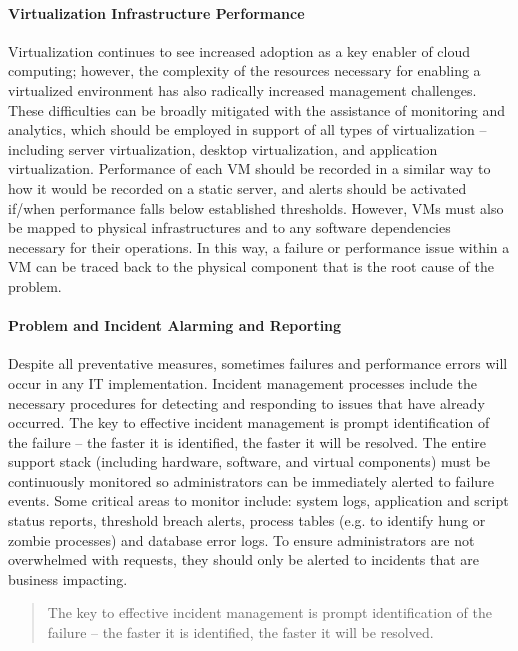 \documentclass[8pt]{extarticle}
\begin{document}
\begin{multicols}{3}
\paragraph{Virtualization Infrastructure Performance}
Virtualization continues to see increased adoption as a key enabler of cloud computing; however, the
complexity of the resources necessary for enabling a virtualized environment has also radically increased
management challenges. These difficulties can be broadly mitigated with the assistance of monitoring
and analytics, which should be employed in support of all types of virtualization – including server
virtualization, desktop virtualization, and application virtualization. Performance of each VM should
be recorded in a similar way to how it would be recorded on a static server, and alerts should be
activated if/when performance falls below established thresholds. However, VMs must also be mapped
to physical infrastructures and to any software dependencies necessary for their operations. In this way,
a failure or performance issue within a VM can be traced back to the physical component that is the
root cause of the problem.

\paragraph{Problem and Incident Alarming and Reporting}
Despite all preventative measures, sometimes failures and performance errors will occur in any IT
implementation. Incident management processes include the necessary procedures for detecting and
responding to issues that have already occurred. The key to effective incident management is prompt
identification of the failure – the faster it is identified, the faster it will
be resolved. The entire support stack (including hardware, software, and virtual components) must be continuously 
monitored so administrators can be immediately alerted to failure events. Some critical areas to monitor include: 
system logs, application and script status reports, threshold breach alerts, process tables 
(e.g. to identify hung or zombie processes) and database error logs.
To ensure administrators are not overwhelmed with requests, they should only be alerted to incidents that are business
impacting.

\begin{quotation}
    \noindent
The key to effective incident management is prompt identification of the failure – the faster it is identified, 
the faster it will be resolved.
\end{quotation}



\end{multicols}
\end{document}
